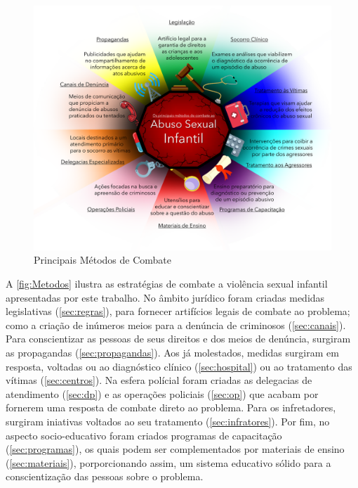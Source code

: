 \begin{figure}[htb]
  
	\caption{\label{fig:Metodos}Principais Métodos de Combate}\vspace{-0.2cm}
  \begin{adjustwidth}{-4.2cm}{-0.0cm}
    \includegraphics[scale=0.65]{./Figuras/MétodosCombate.pdf}
	\end{adjustwidth}\vspace{-1.5cm}

\end{figure}

\newpage



A \autoref{fig:Metodos} ilustra as estratégias de combate a violência sexual infantil apresentadas por este trabalho. No âmbito jurídico foram criadas medidas legislativas (\autoref{sec:regras}), para fornecer artifícios legais de combate ao problema; como a criação de inúmeros meios para a denúncia de criminosos (\autoref{sec:canais}). Para conscientizar as pessoas de seus direitos e dos meios de denúncia, surgiram as propagandas (\autoref{sec:propagandas}). Aos já molestados, medidas surgiram em resposta, voltadas ou ao diagnóstico clínico (\autoref{sec:hospital}) ou ao tratamento das vítimas (\autoref{sec:centros}). Na esfera polícial foram criadas as delegacias de atendimento (\autoref{sec:dp}) e as operações policiais (\autoref{sec:op}) que acabam por fornerem uma resposta de combate direto ao problema. Para os infretadores, surgiram iniativas voltados ao seu tratamento  (\autoref{sec:infratores}). Por fim, no aspecto socio-educativo foram criados programas de capacitação (\autoref{sec:programas}), os quais podem ser complementados por materiais de ensino (\autoref{sec:materiais}), porporcionando assim, um sistema educativo sólido para a conscientização das pessoas sobre o problema. 

